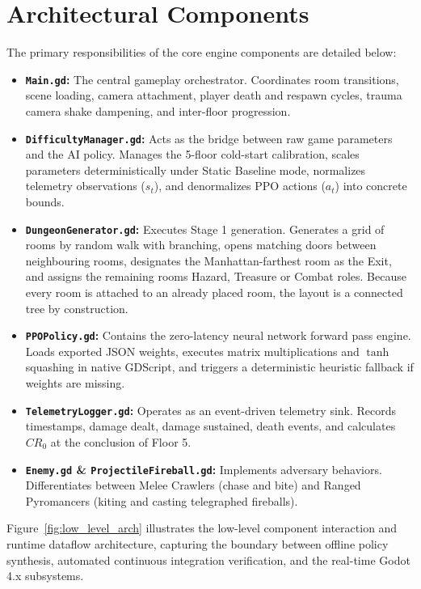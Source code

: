 \section{Architectural Components}
The primary responsibilities of the core engine components are detailed below:
\begin{itemize}
    \item \textbf{\texttt{Main.gd}:} The central gameplay orchestrator. Coordinates room transitions, scene loading, camera attachment, player death and respawn cycles, trauma camera shake dampening, and inter-floor progression.
    \item \textbf{\texttt{DifficultyManager.gd}:} Acts as the bridge between raw game parameters and the AI policy. Manages the 5-floor cold-start calibration, scales parameters deterministically under Static Baseline mode, normalizes telemetry observations ($s_t$), and denormalizes PPO actions ($a_t$) into concrete bounds.
    \item \textbf{\texttt{DungeonGenerator.gd}:} Executes Stage 1 generation. Generates a grid of rooms by random walk with branching, opens matching doors between neighbouring rooms, designates the Manhattan-farthest room as the Exit, and assigns the remaining rooms Hazard, Treasure or Combat roles. Because every room is attached to an already placed room, the layout is a connected tree by construction.
    \item \textbf{\texttt{PPOPolicy.gd}:} Contains the zero-latency neural network forward pass engine. Loads exported JSON weights, executes matrix multiplications and $\tanh$ squashing in native GDScript, and triggers a deterministic heuristic fallback if weights are missing.
    \item \textbf{\texttt{TelemetryLogger.gd}:} Operates as an event-driven telemetry sink. Records timestamps, damage dealt, damage sustained, death events, and calculates $CR_0$ at the conclusion of Floor 5.
    \item \textbf{\texttt{Enemy.gd} \& \texttt{ProjectileFireball.gd}:} Implements adversary behaviors. Differentiates between Melee Crawlers (chase and bite) and Ranged Pyromancers (kiting and casting telegraphed fireballs).
\end{itemize}

Figure~\ref{fig:low_level_arch} illustrates the low-level component interaction and runtime dataflow architecture, capturing the boundary between offline policy synthesis, automated continuous integration verification, and the real-time Godot 4.x subsystems.

